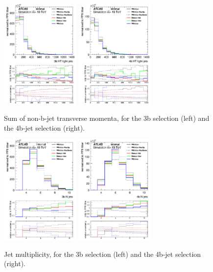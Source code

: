 \begin{figure}[!htb]
\centering
\includegraphics[width=0.35\textwidth]{Plots/ttbb/hisgenHTljets_4j3t__div}
\includegraphics[width=0.35\textwidth]{Plots/ttbb/hisgenHTljets_4j4t__div}
  \caption{Sum of non-b-jet transverse momenta, for the 3b selection (left) and the 4b-jet selection (right). \label{ttbb:HTljets}}
\end{figure}

\begin{figure}[!htb]
\centering
\includegraphics[width=0.35\textwidth]{Plots/ttbb/hisgenNjets_4j3t__div}
\includegraphics[width=0.35\textwidth]{Plots/ttbb/hisgenNjets_4j4t__div}
  \caption{Jet multiplicity, for the 3b selection (left) and the 4b-jet selection (right). \label{ttbb:Njets}}
\end{figure}